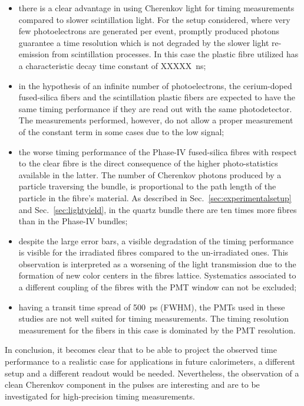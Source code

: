 \documentclass[a4paper,11pt]{article}
\begin{document}
\begin{itemize}
\item there is a clear advantage in using Cherenkov light for timing measurements compared to slower scintillation light. For the setup considered, where very few photoelectrons are generated per event, promptly produced photons guarantee a time resolution which is not degraded by the slower light re-emission from scintillation processes. In this case the plastic fibre utilized has a characteristic decay time constant of XXXXX~ns;
\item in the hypothesis of an infinite number of photoelectrons, the cerium-doped fused-silica fibers and the scintillation plastic fibers are expected to have the same timing performance if they are read out with the same photodetector. The measurements performed, however, do not allow a proper measurement of the constant term in some cases due to the low signal;
\item the worse timing performance of the Phase-IV fused-silica fibres with respect to the clear fibre is the direct consequence of the higher photo-statistics available in the latter. The number of Cherenkov photons produced by a particle traversing the bundle, is proportional to the path length of the particle in the fibre's material. As described in Sec.~\ref{sec:experimentalsetup} and Sec.~\ref{sec:lightyield}, in the quartz bundle there are ten times more fibres than in the Phase-IV bundles;
\item despite the large error bars, a visible degradation of the timing performance is visible for the irradiated fibres compared to the un-irradiated ones. This observation is interpreted as a worsening of the light transmission due to the formation of new color centers in the fibres lattice. Systematics associated to a different coupling of the fibres with the PMT window can not be excluded;
\item having a transit time spread of 500~ps (FWHM), the PMTs used in these studies are not well suited for timing measurements. The timing resolution measurement for the fibers in this case is dominated by the PMT resolution.
\end{itemize}
In conclusion, it becomes clear that to be able to project the observed time performance to a realistic case for applications in future calorimeters, a different setup and a different readout would be needed. Nevertheless, the observation of a clean Cherenkov component in the pulses are interesting and are to be investigated for high-precision timing measurements.
\end{document}
